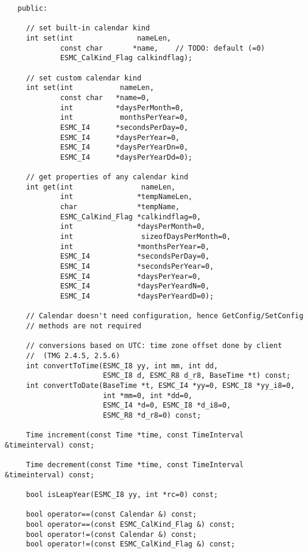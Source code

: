 \begin{verbatim} 
   public:
 
     // set built-in calendar kind
     int set(int               nameLen,
             const char       *name,    // TODO: default (=0)
             ESMC_CalKind_Flag calkindflag);
 
     // set custom calendar kind
     int set(int           nameLen,      
             const char   *name=0,
             int          *daysPerMonth=0,
             int           monthsPerYear=0,
             ESMC_I4      *secondsPerDay=0,
             ESMC_I4      *daysPerYear=0,
             ESMC_I4      *daysPerYearDn=0,
             ESMC_I4      *daysPerYearDd=0);
 
     // get properties of any calendar kind
     int get(int                nameLen,
             int               *tempNameLen,
             char              *tempName,
             ESMC_CalKind_Flag *calkindflag=0,
             int               *daysPerMonth=0,
             int                sizeofDaysPerMonth=0,
             int               *monthsPerYear=0,
             ESMC_I4           *secondsPerDay=0,
             ESMC_I4           *secondsPerYear=0,
             ESMC_I4           *daysPerYear=0,
             ESMC_I4           *daysPerYeardN=0,
             ESMC_I4           *daysPerYeardD=0);
 
     // Calendar doesn't need configuration, hence GetConfig/SetConfig
     // methods are not required
 
     // conversions based on UTC: time zone offset done by client
     //  (TMG 2.4.5, 2.5.6)
     int convertToTime(ESMC_I8 yy, int mm, int dd,
                       ESMC_I8 d, ESMC_R8 d_r8, BaseTime *t) const;
     int convertToDate(BaseTime *t, ESMC_I4 *yy=0, ESMC_I8 *yy_i8=0,
                       int *mm=0, int *dd=0,
                       ESMC_I4 *d=0, ESMC_I8 *d_i8=0,
                       ESMC_R8 *d_r8=0) const;
 
     Time increment(const Time *time, const TimeInterval &timeinterval) const;
 
     Time decrement(const Time *time, const TimeInterval &timeinterval) const;
 
     bool isLeapYear(ESMC_I8 yy, int *rc=0) const;
 
     bool operator==(const Calendar &) const;
     bool operator==(const ESMC_CalKind_Flag &) const;
     bool operator!=(const Calendar &) const;
     bool operator!=(const ESMC_CalKind_Flag &) const;
 

\end{verbatim}
